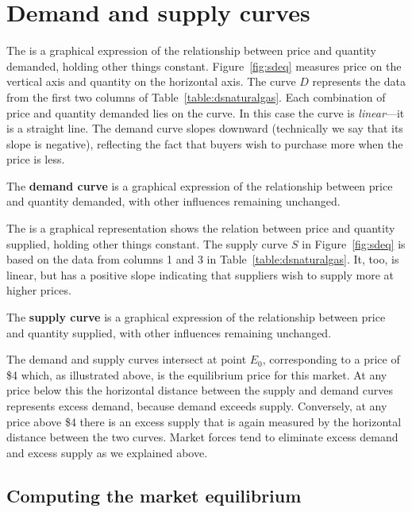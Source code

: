 \section{Demand and supply curves}\label{sec:ch3sec3}

The  is a graphical expression of the relationship between price and quantity demanded, holding other things constant. Figure~\ref{fig:sdeq} measures price on the vertical axis and quantity on the horizontal axis. The curve $D$ represents the data from the first two columns of Table~\ref{table:dsnaturalgas}. Each combination of price and quantity demanded lies on the curve. In this case the curve is \textit{linear}---it is a straight line. The demand curve slopes downward (technically we say that its slope is negative), reflecting the fact that buyers wish to purchase more when the price is less.

\begin{DefBox}
The \textbf{demand curve} is a graphical expression of the relationship between price and quantity demanded, with other influences remaining unchanged.
\end{DefBox}

The  is a graphical representation shows the relation between price and quantity supplied, holding other things constant. The supply curve $S$ in Figure~\ref{fig:sdeq} is based on the data from columns 1 and 3 in Table~\ref{table:dsnaturalgas}. It, too, is linear, but has a positive slope indicating that suppliers wish to supply more at higher prices.

\begin{DefBox}
The \textbf{supply curve} is a graphical expression of the relationship between price and quantity supplied, with other influences remaining unchanged.
\end{DefBox}



The demand and supply curves intersect at point $E_0$, corresponding to a price of \$4 which, as illustrated above, is the equilibrium price for this market. At any price below this the horizontal distance between the supply and demand curves represents excess demand, because demand exceeds supply. Conversely, at any price above \$4 there is an excess supply that is again measured by the horizontal distance between the two curves. Market forces tend to eliminate excess demand and excess supply as we explained above.

\subsection*{Computing the market equilibrium}

